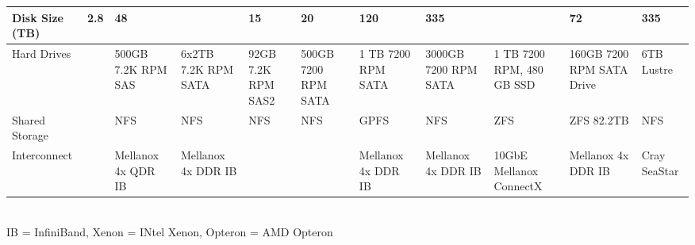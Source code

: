 \begin{sidewaystable}
\begin{footnotesize}
\begin{tabular}{|p{2cm}||p{1.5cm}p{1.5cm}p{1.5cm}p{1.5cm}p{1.5cm}p{1.5cm}p{1.5cm}p{1.5cm}p{1.5cm}p{1cm}|}
 Disk Size (TB)                      &2.8&48&&15&20&120&335& & 72&335 \\
\hline
 Hard Drives                         && 500GB 7.2K RPM SAS & 6x2TB
 7.2K RPM SATA & 92GB 7.2K RPM SAS2 & 500GB 7200 RPM SATA & 1 TB 7200
 RPM SATA & 3000GB 7200 RPM SATA& 1 TB 7200 RPM, 480 GB SSD& 160GB 7200 RPM SATA Drive & 6TB Lustre \\
\hline
 Shared Storage                      && NFS & NFS &NFS& NFS & GPFS &
 NFS & ZFS & ZFS 82.2TB & NFS \\
\hline
 Interconnect                        && Mellanox 4x QDR IB & Mellanox
 4x DDR IB &&& Mellanox 4x DDR IB & Mellanox 4x DDR IB & 10GbE
 Mellanox ConnectX & Mellanox 4x DDR IB & Cray SeaStar \\
\hline
\end{tabular}
~\\
IB = InfiniBand, Xenon = INtel Xenon, Opteron = AMD Opteron 

\end{footnotesize}

\end{sidewaystable}